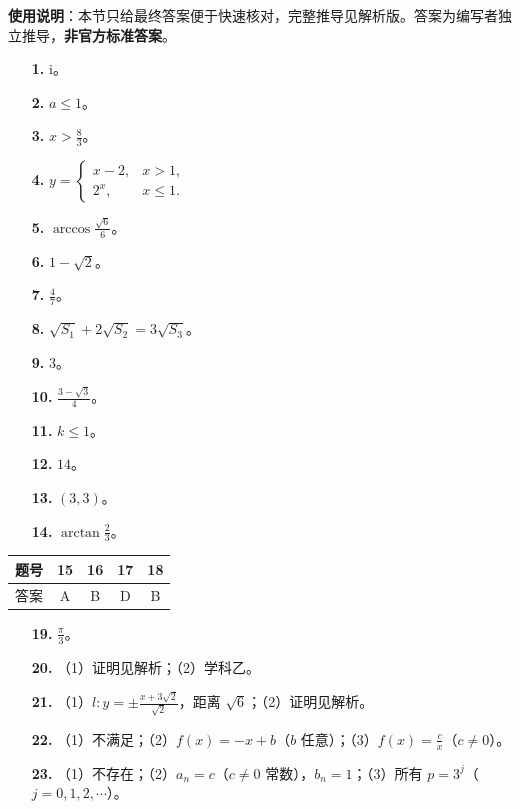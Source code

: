 
\begin{gknotice}
\textbf{使用说明}：本节只给最终答案便于快速核对，完整推导见解析版。答案为编写者独立推导，\textbf{非官方标准答案}。
\end{gknotice}

\begin{itemize}[leftmargin=2.6em]
  \item[\textbf{1.}] $\mathrm i$。
  \item[\textbf{2.}] $a\leqslant1$。
  \item[\textbf{3.}] $x>\frac83$。
  \item[\textbf{4.}] $y=\begin{cases}x-2,&x>1,\\2^x,&x\leqslant1.\end{cases}$
  \item[\textbf{5.}] $\arccos\frac{\sqrt6}{6}$。
  \item[\textbf{6.}] $1-\sqrt2$。
  \item[\textbf{7.}] $\frac47$。
  \item[\textbf{8.}] $\sqrt{S_1}+2\sqrt{S_2}=3\sqrt{S_3}$。
  \item[\textbf{9.}] $3$。
  \item[\textbf{10.}] $\frac{3-\sqrt3}{4}$。
  \item[\textbf{11.}] $k\leqslant1$。
  \item[\textbf{12.}] $14$。
  \item[\textbf{13.}] $(3,3)$。
  \item[\textbf{14.}] $\arctan\frac23$。
\end{itemize}

\begin{center}\begin{tabular}{ccccc}
\toprule
题号 & 15 & 16 & 17 & 18 \\
\midrule
答案 & A & B & D & B \\
\bottomrule
\end{tabular}\end{center}

\begin{itemize}[leftmargin=2.6em]
  \item[\textbf{19.}] $\frac{\pi}{3}$。
  \item[\textbf{20.}] （1）证明见解析；（2）学科乙。
  \item[\textbf{21.}] （1）$l:y=\pm\frac{x+3\sqrt2}{\sqrt2}$，距离 $\sqrt6$；（2）证明见解析。
  \item[\textbf{22.}] （1）不满足；（2）$f(x)=-x+b$（$b$ 任意）；（3）$f(x)=\frac cx$（$c\neq0$）。
  \item[\textbf{23.}] （1）不存在；（2）$a_n=c$（$c\neq0$ 常数），$b_n=1$；（3）所有 $p=3^j$（$j=0,1,2,\cdots$）。
\end{itemize}
